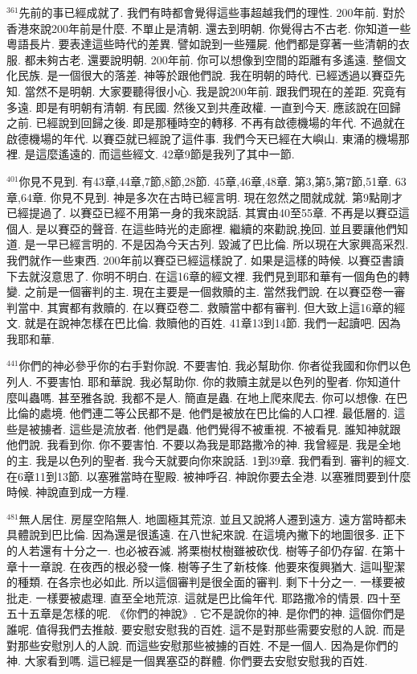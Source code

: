 \documentclass{book}
\begin{document}
$^{361}$先前的事已經成就了.
我們有時都會覺得這些事超越我們的理性.
200年前.
對於香港來說200年前是什麼.
不單止是清朝.
還去到明朝.
你覺得古不古老.
你知道一些粵語長片.
要表達這些時代的差異.
譬如說到一些殭屍.
他們都是穿著一些清朝的衣服.
都未夠古老.
還要說明朝.
200年前.
你可以想像到空間的距離有多遙遠.
整個文化民族.
是一個很大的落差.
神等於跟他們說.
我在明朝的時代.
已經透過以賽亞先知.
當然不是明朝.
大家要聽得很小心.
我是說200年前.
跟我們現在的差距.
究竟有多遠.
即是有明朝有清朝.
有民國.
然後又到共產政權.
一直到今天.
應該說在回歸之前.
已經說到回歸之後.
即是那種時空的轉移.
不再有啟德機場的年代.
不過就在啟德機場的年代.
以賽亞就已經說了這件事.
我們今天已經在大嶼山.
東涌的機場那裡.
是這麼遙遠的.
而這些經文.
42章9節是我列了其中一節.

$^{401}$你見不見到.
有43章,44章,7節,8節,28節.
45章,46章,48章.
第3,第5,第7節,51章.
63章,64章.
你見不見到.
神是多次在古時已經言明.
現在忽然之間就成就.
第9點剛才已經提過了.
以賽亞已經不用第一身的我來說話.
其實由40至55章.
不再是以賽亞這個人.
是以賽亞的聲音.
在這些時光的走廊裡.
繼續的來勸說,挽回.
並且要讓他們知道.
是一早已經言明的.
不是因為今天古列.
毀滅了巴比倫.
所以現在大家興高采烈.
我們就作一些東西.
200年前以賽亞已經這樣說了.
如果是這樣的時候.
以賽亞書讀下去就沒意思了.
你明不明白.
在這16章的經文裡.
我們見到耶和華有一個角色的轉變.
之前是一個審判的主.
現在主要是一個救贖的主.
當然我們說.
在以賽亞卷一審判當中.
其實都有救贖的.
在以賽亞卷二.
救贖當中都有審判.
但大致上這16章的經文.
就是在說神怎樣在巴比倫.
救贖他的百姓.
41章13到14節.
我們一起讀吧.
因為我耶和華.

$^{441}$你們的神必參乎你的右手對你說.
不要害怕.
我必幫助你.
你者從我國和你們以色列人.
不要害怕.
耶和華說.
我必幫助你.
你的救贖主就是以色列的聖者.
你知道什麼叫蟲嗎.
甚至雅各說.
我都不是人.
簡直是蟲.
在地上爬來爬去.
你可以想像.
在巴比倫的處境.
他們連二等公民都不是.
他們是被放在巴比倫的人口裡.
最低層的.
這些是被擄者.
這些是流放者.
他們是蟲.
他們覺得不被重視.
不被看見.
誰知神就跟他們說.
我看到你.
你不要害怕.
不要以為我是耶路撒冷的神.
我曾經是.
我是全地的主.
我是以色列的聖者.
我今天就要向你來說話.
1到39章.
我們看到.
審判的經文.
在6章11到13節.
以塞雅當時在聖殿.
被神呼召.
神說你要去全港.
以塞雅問要到什麼時候.
神說直到成一方糧.

$^{481}$無人居住.
房屋空陷無人.
地圖極其荒涼.
並且又說將人遷到遠方.
遠方當時都未具體說到巴比倫.
因為還是很遙遠.
在八世紀來說.
在這境內撇下的地圖很多.
正下的人若還有十分之一.
也必被吞滅.
將栗樹杖樹雖被砍伐.
樹等子卻仍存留.
在第十章十一章說.
在夜西的根必發一條.
樹等子生了新枝條.
他要來復興猶大.
這叫聖潔的種類.
在各宗也必如此.
所以這個審判是很全面的審判.
剩下十分之一.
一樣要被批走.
一樣要被處理.
直至全地荒涼.
這就是巴比倫年代.
耶路撒冷的情景.
四十至五十五章是怎樣的呢.
《你們的神說》.
它不是說你的神.
是你們的神.
這個你們是誰呢.
值得我們去推敲.
要安慰安慰我的百姓.
這不是對那些需要安慰的人說.
而是對那些安慰別人的人說.
而這些安慰那些被擄的百姓.
不是一個人.
因為是你們的神.
大家看到嗎.
這已經是一個異塞亞的群體.
你們要去安慰安慰我的百姓.
\end{document}
